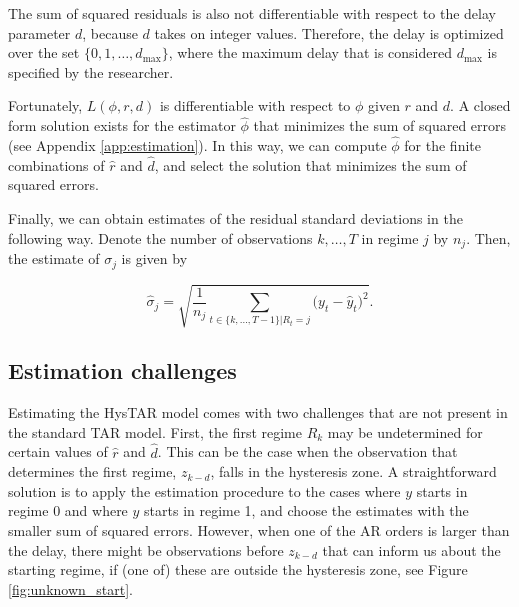 \documentclass{article}
\begin{document}
The sum of squared residuals is also not differentiable with respect to the delay parameter $d$, because $d$ takes on integer values. Therefore, the delay is optimized over the set $\{0, 1, \dots, d_{\max}\}$, where the maximum delay that is considered $d_{\max}$ is specified by the researcher.

Fortunately, $L(\phi, r, d)$ is differentiable with respect to $\phi$ given $r$ and $d$. A closed form solution exists for the estimator $\hat{\phi}$ that minimizes the sum of squared errors (see Appendix \ref{app:estimation}). 
In this way, we can compute $\hat{\phi}$ for the finite combinations of $\hat{r}$ and $\hat{d}$, and select the solution that minimizes the sum of squared errors.

Finally, we can obtain estimates of the residual standard deviations in the following way. Denote the number of observations $k, \dots, T$ in regime $j$ by $n_j$. Then, the estimate of $\sigma_{j}$ is given by

\begin{equation}
\hat{\sigma}_{j} = \sqrt{\frac{1}{n_j} \sum_{t \in \{k, \dots, T-1\}| R_t = j} \big(y_t - \hat{y}_t \big)^2}.
\end{equation} 

\subsection{Estimation challenges}
Estimating the HysTAR model comes with two challenges that are not present in the standard TAR model.
First, the first regime $R_k$ may be undetermined for certain values of $\hat{r}$ and $\hat{d}$. 
This can be the case when the observation that determines the first regime, $z_{k-d}$, falls in the hysteresis zone.
A straightforward solution is to apply the estimation procedure to the cases where $y$ starts in regime 0 and where $y$ starts in regime 1, and choose the estimates with the smaller sum of squared errors.
However, when one of the AR orders is larger than the delay, there might be observations before $z_{k-d}$ that can inform us about the starting regime, if (one of) these are outside the hysteresis zone, see Figure \ref{fig:unknown_start}.
\end{document}
